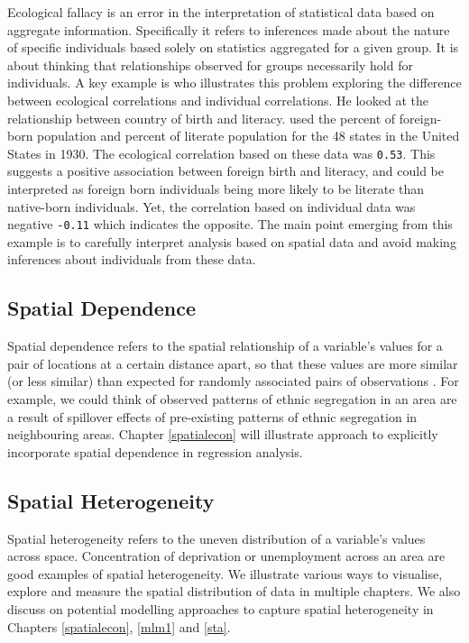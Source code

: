 \documentclass[
]{book}
\begin{document}
Ecological fallacy is an error in the interpretation of statistical data based on aggregate information. Specifically it refers to inferences made about the nature of specific individuals based solely on statistics aggregated for a given group. It is about thinking that relationships observed for groups necessarily hold for individuals. A key example is \citet{robinson1950ecological} who illustrates this problem exploring the difference between ecological correlations and individual correlations. He looked at the relationship between country of birth and literacy. \citet{robinson1950ecological} used the percent of foreign-born population and percent of literate population for the 48 states in the United States in 1930. The ecological correlation based on these data was \texttt{0.53}. This suggests a positive association between foreign birth and literacy, and could be interpreted as foreign born individuals being more likely to be literate than native-born individuals. Yet, the correlation based on individual data was negative \texttt{-0.11} which indicates the opposite. The main point emerging from this example is to carefully interpret analysis based on spatial data and avoid making inferences about individuals from these data.

\hypertarget{spatial-dependence}{%
\subsection{Spatial Dependence}\label{spatial-dependence}}

Spatial dependence refers to the spatial relationship of a variable's values for a pair of locations at a certain distance apart, so that these values are more similar (or less similar) than expected for randomly associated pairs of observations \citep{anselin1988spatial}. For example, we could think of observed patterns of ethnic segregation in an area are a result of spillover effects of pre-existing patterns of ethnic segregation in neighbouring areas. Chapter \ref{spatialecon} will illustrate approach to explicitly incorporate spatial dependence in regression analysis.

\hypertarget{spatial-heterogeneity}{%
\subsection{Spatial Heterogeneity}\label{spatial-heterogeneity}}

Spatial heterogeneity refers to the uneven distribution of a variable's values across space. Concentration of deprivation or unemployment across an area are good examples of spatial heterogeneity. We illustrate various ways to visualise, explore and measure the spatial distribution of data in multiple chapters. We also discuss on potential modelling approaches to capture spatial heterogeneity in Chapters \ref{spatialecon}, \ref{mlm1} and \ref{sta}.
\end{document}
